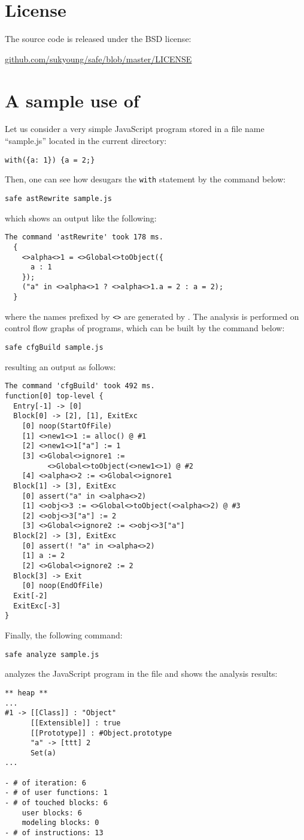 \section{License}
The \safe source code is released under the BSD license:
\begin{center}
\url{github.com/sukyoung/safe/blob/master/LICENSE}
\end{center}


\section{A sample use of \safe}
\label{sec:usage-example}
Let us consider a very simple JavaScript program stored in a file name ``{sample.js}'' located
in the current directory:
\begin{verbatim}
with({a: 1}) {a = 2;}
\end{verbatim}
Then, one can see how \safe desugars the \texttt{with} statement by the command below:
\begin{verbatim}
safe astRewrite sample.js
\end{verbatim}
which shows an output like the following:
{\small
\begin{verbatim}
The command 'astRewrite' took 178 ms.
  {
    <>alpha<>1 = <>Global<>toObject({
      a : 1
    });
    ("a" in <>alpha<>1 ? <>alpha<>1.a = 2 : a = 2);
  }
\end{verbatim}
}
\noindent
where the names prefixed by \verb!<>! are generated by \safe.
The \safe analysis is performed on control flow graphs of programs,
which can be built by the command below:
\begin{verbatim}
safe cfgBuild sample.js
\end{verbatim}
\noindent
resulting an output as follows:
{\small
\begin{verbatim}
The command 'cfgBuild' took 492 ms.
function[0] top-level {
  Entry[-1] -> [0]
  Block[0] -> [2], [1], ExitExc
    [0] noop(StartOfFile)
    [1] <>new1<>1 := alloc() @ #1
    [2] <>new1<>1["a"] := 1
    [3] <>Global<>ignore1 :=
          <>Global<>toObject(<>new1<>1) @ #2
    [4] <>alpha<>2 := <>Global<>ignore1
  Block[1] -> [3], ExitExc
    [0] assert("a" in <>alpha<>2)
    [1] <>obj<>3 := <>Global<>toObject(<>alpha<>2) @ #3
    [2] <>obj<>3["a"] := 2
    [3] <>Global<>ignore2 := <>obj<>3["a"]
  Block[2] -> [3], ExitExc
    [0] assert(! "a" in <>alpha<>2)
    [1] a := 2
    [2] <>Global<>ignore2 := 2
  Block[3] -> Exit
    [0] noop(EndOfFile)
  Exit[-2]
  ExitExc[-3]
}
\end{verbatim}
}
\noindent
Finally, the following command:
\begin{verbatim}
safe analyze sample.js
\end{verbatim}
analyzes the JavaScript program in the file and shows the analysis results:
{\small
\begin{verbatim}
** heap **
...
#1 -> [[Class]] : "Object"
      [[Extensible]] : true
      [[Prototype]] : #Object.prototype
      "a" -> [ttt] 2
      Set(a)
...

- # of iteration: 6
- # of user functions: 1
- # of touched blocks: 6
    user blocks: 6
    modeling blocks: 0
- # of instructions: 13
\end{verbatim}
}
